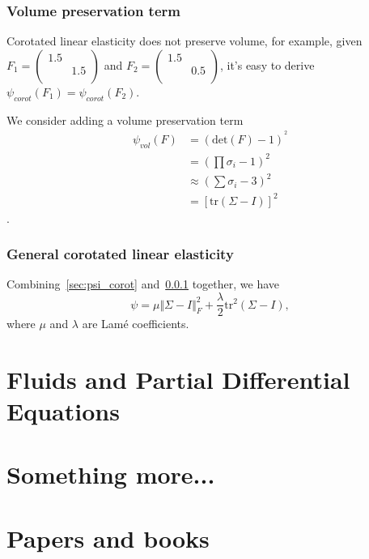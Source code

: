 \documentclass{fancydoc}
\begin{document}
\subsubsection{Volume preservation term}\label{sec:psi_vol}
Corotated linear elasticity does not preserve volume, for example, given $F_1 = \begin{pmatrix}
1.5 & \\ 
 & 1.5 \\
\end{pmatrix}$ and $F_2 = \begin{pmatrix}
1.5 & \\
 & 0.5 \\
\end{pmatrix}$, it's easy to derive $\psi_{corot}(F_1) = \psi_{corot}(F_2)$.

We consider adding a volume preservation term
\begin{subequations}
\begin{align}
\psi_{vol}(F) &= (\mathrm{det}(F) - 1)^^2 \\
              &= (\prod \sigma_i - 1)^2	 \\
              &\approx (\sum \sigma_i - 3)^2 \\
              &=[\mathrm{tr}(\Sigma - I)]^2
\end{align}
\end{subequations}.

\subsubsection{General corotated linear elasticity}
Combining~\ref{sec:psi_corot} and~\ref{sec:psi_vol} together, we have
\begin{equation}
\psi = \mu \Vert \Sigma - I\Vert^2_F + \frac{\lambda}{2} \mathrm{tr}^2(\Sigma - I),
\end{equation}
where $\mu$ and $\lambda$ are Lamé coefficients.

\section{Fluids and Partial Differential Equations}

\section{Something more...}

\section{Papers and books}
\end{document}
